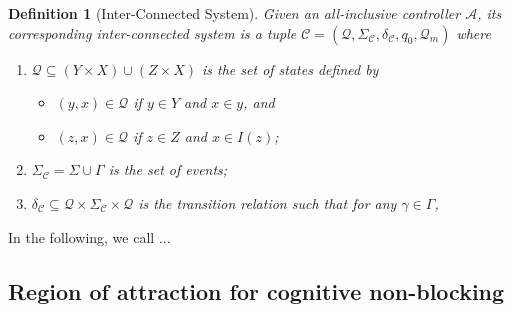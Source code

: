 \documentclass{article}
\newtheorem{definition}{Definition}
\begin{document}
\begin{definition}[Inter-Connected System]
    Given an all-inclusive controller $\mathcal{A}$, its corresponding inter-connected system is a tuple
    $\mathcal{C} = (\mathcal{Q}, \Sigma_\mathcal{C}, \delta_\mathcal{C}, q_0, \mathcal{Q}_m)$
    where
\begin{enumerate}
    \item $\mathcal{Q} \subseteq (Y \times X) \cup (Z \times X)$ is the set of states defined by
    \begin{itemize}
        \item $(y, x) \in \mathcal{Q}$ if $y \in Y$ and $x \in y$, and
        \item $(z, x) \in \mathcal{Q}$ if $z \in Z$ and $x \in I(z)$;
    \end{itemize}
    \item $\Sigma_\mathcal{C} = \Sigma \cup \Gamma$ is the set of events;
    \item $\delta_\mathcal{C} \subseteq \mathcal{Q} \times \Sigma_\mathcal{C} \times \mathcal{Q}$ is the transition relation such that for any $\gamma \in \Gamma$,

\end{enumerate}
\end{definition}

In the following, we call $...$

\subsection{Region of attraction for cognitive non-blocking}

\end{document}
